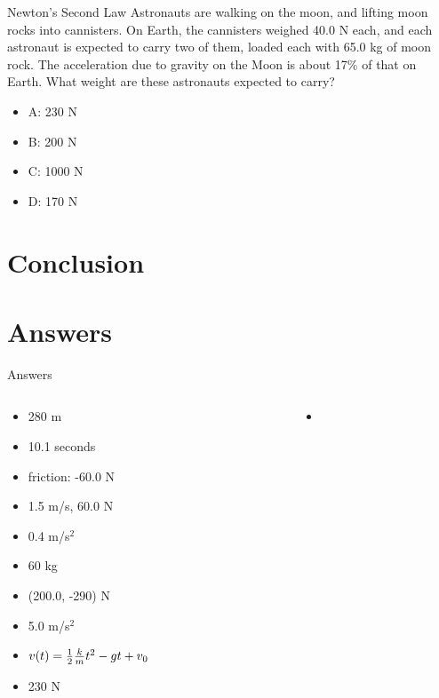 \documentclass{beamer}
\begin{document}
\begin{frame}{Newton's Second Law}
Astronauts are walking on the moon, and lifting moon rocks into cannisters.  On Earth, the cannisters weighed 40.0 N each, and each astronaut is expected to carry two of them, loaded each with 65.0 kg of moon rock.  The acceleration due to gravity on the Moon is about 17\% of that on Earth.  What weight are these astronauts expected to carry?
\begin{itemize}
\item A: 230 N
\item B: 200 N
\item C: 1000 N
\item D: 170 N
\end{itemize}
\end{frame}

\section{Conclusion}

\section{Answers}

\begin{frame}{Answers}
\begin{columns}[T]
\begin{column}{0.5\textwidth}
\begin{itemize}
\item 280 m
\item 10.1 seconds
\item friction: -60.0 N
\item 1.5 m/s, 60.0 N
\item 0.4 m/s$^2$
\item 60 kg
\item (200.0, -290) N
\item 5.0 m/s$^2$
\item $v(t) = \frac{1}{2} \frac{k}{m} t^2 - gt +v_{\rm 0}$
\item 230 N
\end{itemize}
\end{column}
\begin{column}{0.5\textwidth}
\begin{itemize}
\item
\end{itemize}
\end{column}
\end{columns}
\end{frame}
\end{document}
